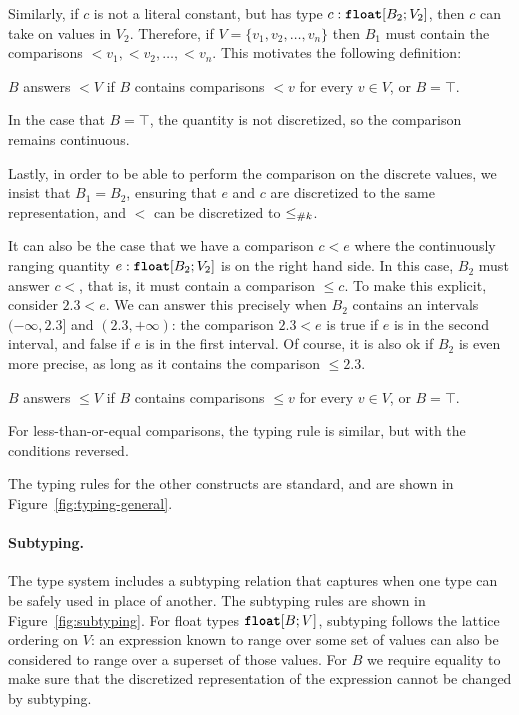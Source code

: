 Similarly, if $c$ is not a literal constant, but has type $c : \text{\ttfamily\bfseries float}[B_2; V_2]$, then $c$ can take on values in $V_2$. Therefore, if $V = \{v_1, v_2, \dots, v_n\}$ then $B_1$ must contain the comparisons $<\!\!v_1, <\!\!v_2, \dots, <\!\!v_n$. This motivates the following definition:

\begin{definition}
    \label{def:answers-less}
    $B$ answers $<\!\!V$ if $B$ contains comparisons $<\!\!v$ for every $v \in V$, or $B = \top$.
\end{definition}

In the case that $B = \top$, the quantity is not discretized, so the comparison remains continuous.

Lastly, in order to be able to perform the comparison on the discrete values, we insist that $B_1 = B_2$, ensuring that $e$ and $c$ are discretized to the same representation, and $<$ can be discretized to $\leq_{\#{k}}$.

It can also be the case that we have a comparison $c < e$ where the continuously ranging quantity $e : \text{\ttfamily\bfseries float}[B_2; V_2]$ is on the right hand side. In this case, $B_2$ must answer $c\!\!<$, that is, it must contain a comparison $\leq\!\!c$. To make this explicit, consider $2.3 < e$. We can answer this precisely when $B_2$ contains an intervals $(-\infty, 2.3]$ and $(2.3, +\infty)$: the comparison $2.3 < e$ is true if $e$ is in the second interval, and false if $e$ is in the first interval. Of course, it is also ok if $B_2$ is even more precise, as long as it contains the comparison $\leq\!\!2.3$.

\begin{definition}
    \label{def:answers-less-equal}
    $B$ answers $\leq\!\!V$ if $B$ contains comparisons $\leq\!\!v$ for every $v \in V$, or $B = \top$.
\end{definition}

For less-than-or-equal comparisons, the typing rule is similar, but with the conditions reversed.



The typing rules for the other constructs are standard, and are shown in Figure~\ref{fig:typing-general}.

\paragraph{Subtyping.}
The type system includes a subtyping relation that captures when one type can be safely used in place of another. The subtyping rules are shown in Figure~\ref{fig:subtyping}. For float types $\text{\ttfamily\bfseries float}[B;V]$, subtyping follows the lattice ordering on $V$: an expression known to range over some set of values can also be considered to range over a superset of those values. For $B$ we require equality to make sure that the discretized representation of the expression cannot be changed by subtyping.

